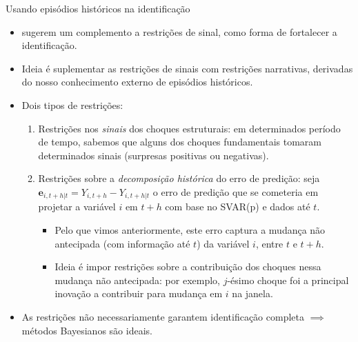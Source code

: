 \documentclass[11pt]{beamer}
\begin{document}
\begin{frame}{Usando episódios históricos na identificação}
\begin{itemize}
	\item \citet{antolin2018} sugerem um complemento a restrições de sinal, como forma de fortalecer a identificação.
	\item Ideia é suplementar as restrições de sinais com {\color{blue}restrições narrativas}, derivadas do nosso conhecimento externo de episódios históricos.
	\item Dois tipos de restrições:
	\begin{enumerate}
		\item Restrições nos \emph{sinais} dos choques estruturais: em determinados período de tempo, sabemos que alguns dos choques fundamentais tomaram determinados sinais (surpresas positivas ou negativas).
		\item Restrições sobre a \emph{decomposição histórica} do erro de predição: seja $\boldsymbol{e}_{i,t+h|t} = Y_{i,t+h}-Y_{i,t+h|t}$ o erro de predição que se cometeria em projetar a variável $i$ em $t+h$ com base no SVAR(p) e dados até $t$. 
		\begin{itemize}
			\item 		Pelo que vimos anteriormente, este erro captura a mudança não antecipada (com informação até $t$) da variável $i$, entre $t$ e $t+h$.
			\item Ideia é impor restrições sobre a contribuição dos choques nessa mudança não antecipada: por exemplo, $j$-ésimo choque foi a principal inovação a contribuir para mudança em $i$ na janela.
		\end{itemize}
	\end{enumerate}
			\item As restrições não necessariamente garantem identificação completa $\implies$ métodos Bayesianos são ideais.
\end{itemize}
\end{frame}
\end{document}
